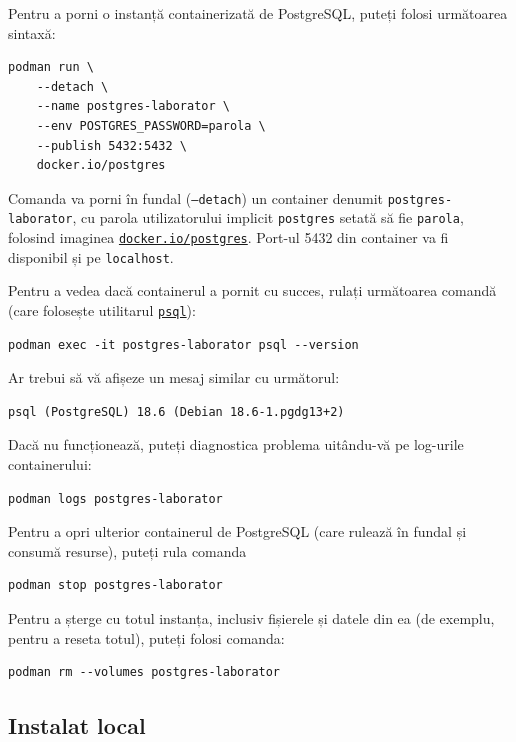 \documentclass[a4paper, 12pt]{article}
\begin{document}
Pentru a porni o instanță containerizată de PostgreSQL, puteți folosi următoarea sintaxă:

\begin{verbatim}
podman run \
    --detach \
    --name postgres-laborator \
    --env POSTGRES_PASSWORD=parola \
    --publish 5432:5432 \
    docker.io/postgres
\end{verbatim}

Comanda va porni în fundal (\texttt{--detach}) un container denumit \texttt{postgres-laborator}, cu parola utilizatorului implicit \texttt{postgres} setată să fie \texttt{parola}, folosind imaginea \href{https://hub.docker.com/_/postgres/}{\texttt{docker.io/postgres}}. Port-ul 5432 din container va fi disponibil și pe \texttt{localhost}.

Pentru a vedea dacă containerul a pornit cu succes, rulați următoarea comandă (care folosește utilitarul \href{https://www.postgresql.org/docs/current/app-psql.html}{\texttt{psql}}):

\begin{verbatim}
podman exec -it postgres-laborator psql --version
\end{verbatim}

Ar trebui să vă afișeze un mesaj similar cu următorul:
\begin{verbatim}
psql (PostgreSQL) 18.6 (Debian 18.6-1.pgdg13+2)
\end{verbatim}

Dacă nu funcționează, puteți diagnostica problema uitându-vă pe log-urile containerului:
\begin{verbatim}
podman logs postgres-laborator
\end{verbatim}

Pentru a opri ulterior containerul de PostgreSQL (care rulează în fundal și consumă resurse), puteți rula comanda

\begin{verbatim}
podman stop postgres-laborator
\end{verbatim}

Pentru a șterge cu totul instanța, {\color{red} inclusiv fișierele și datele din ea} (de exemplu, pentru a reseta totul), puteți folosi comanda:

\begin{verbatim}
podman rm --volumes postgres-laborator
\end{verbatim}

\subsection{Instalat local}
\end{document}

